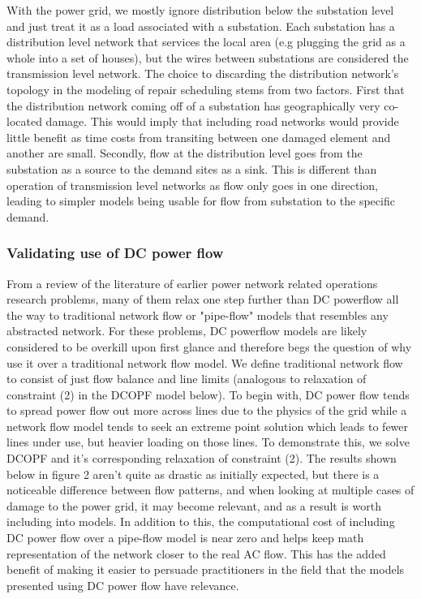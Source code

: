 \documentclass{article}
\begin{document}
	With the power grid, we mostly ignore distribution below the substation level and just treat it as a load associated with a substation. Each substation has a distribution level network that services the local area (e.g plugging the grid as a whole into a set of houses), but the wires between substations are considered the transmission level network. The choice to discarding the distribution network's topology in the modeling of repair scheduling stems from two factors. First that the distribution network coming off of a substation has geographically very co-located damage. This would imply that including road networks would provide little benefit as time costs from transiting between one damaged element and another are small. Secondly, flow at the distribution level goes from the substation as a source to the demand sites as a sink. This is different than operation of transmission level networks as flow only goes in one direction, leading to simpler models being usable for flow from substation to the specific demand.
	\subsubsection{Validating use of DC power flow}
	
	From a review of the literature of earlier power network related operations research problems, many of them relax one step further than DC powerflow all the way to traditional network flow or "pipe-flow" models that resembles any abstracted network. For these problems, DC powerflow models are likely considered to be overkill upon first glance and therefore begs the question of why use it over a traditional network flow model. We define traditional network flow to consist of just flow balance and line limits (analogous to relaxation of constraint (2) in the DCOPF model below). To begin with, DC power flow tends to spread power flow out more across lines due to the physics of the grid while a network flow model tends to seek an extreme point solution which leads to fewer lines under use, but heavier loading on those lines. To demonstrate this, we solve DCOPF and it's corresponding relaxation of constraint (2). The results shown below in figure 2 aren't quite as drastic as initially expected, but there is a noticeable difference between flow patterns, and when looking at multiple cases of damage to the power grid, it may become relevant, and as a result is worth including into models. In addition to this, the computational cost of including DC power flow over a pipe-flow model is near zero and helps keep math representation of the network closer to the real AC flow. This has the added benefit of making it easier to persuade practitioners in the field that the models presented using DC power flow have relevance.
	
\end{document}
